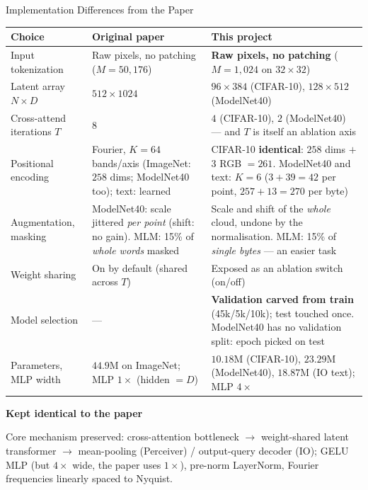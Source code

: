 \documentclass[aspectratio=169,11pt]{beamer}
\newcommand{\colhead}[1]{{\color{HeadBlue}\bfseries #1}\par\vspace{0.25em}}
\begin{document}
\begin{frame}[shrink=23]{Implementation Differences from the Paper}
  \vspace{0.15em}
  \begin{table}
    \centering\scriptsize
    \begin{tabular}{>{\raggedright\arraybackslash}p{}>{\raggedright\arraybackslash}p{}>{\raggedright\arraybackslash}p{}}
      \toprule
      \textbf{Choice} & \textbf{Original paper} & \textbf{This project} \\
      \midrule
      Input tokenization &
      Raw pixels, no patching ($M=50{,}176$) &
      \textbf{Raw pixels, no patching} ($M=1{,}024$ on $32{\times}32$) \\
      \addlinespace[2pt]
      Latent array $N\times D$ &
      $512\times1024$ &
      $96\times384$ (CIFAR-10), $128\times512$ (ModelNet40) \\
      \addlinespace[2pt]
      Cross-attend iterations $T$ &
      $8$ &
      $4$ (CIFAR-10), $2$ (ModelNet40) --- and $T$ is itself an ablation axis \\
      \addlinespace[2pt]
      Positional encoding &
      Fourier, $K=64$ bands/axis (ImageNet: $258$ dims; ModelNet40 too); text: learned &
      CIFAR-10 \textbf{identical}: $258$ dims $+$ 3 RGB $=261$. ModelNet40 and text: \textbf{$K=6$} ($3+39=42$ per point, $257+13=270$ per byte) \\
      \addlinespace[2pt]
      Augmentation, masking &
      ModelNet40: scale jittered \emph{per point} (shift: no gain). MLM: 15\% of \emph{whole words} masked &
      Scale and shift of the \emph{whole} cloud, undone by the normalisation. MLM: 15\% of \emph{single bytes} --- an easier task \\
      \addlinespace[2pt]
      Weight sharing &
      On by default (shared across $T$) &
      Exposed as an ablation switch (on/off) \\
      \addlinespace[2pt]
      Model selection &
      --- &
      \textbf{Validation carved from train} (45k/5k/10k); test touched once. ModelNet40 has no validation split: epoch picked on test \\
      \addlinespace[2pt]
      Parameters, MLP width &
      $44.9$M on ImageNet; MLP $1\times$ (hidden $=D$) &
      $10.18$M (CIFAR-10), $23.29$M (ModelNet40), $18.87$M (IO text); MLP $4\times$ \\
      \bottomrule
    \end{tabular}
  \end{table}

  \vspace{0.3em}
  \colhead{Kept identical to the paper}
    \small Core mechanism preserved: cross-attention bottleneck $\to$ weight-shared latent transformer $\to$ mean-pooling (Perceiver) / output-query decoder (IO); GELU MLP (but $4\times$ wide, the paper uses $1\times$), pre-norm LayerNorm, Fourier frequencies linearly spaced to Nyquist.
  
\end{frame}
\end{document}
